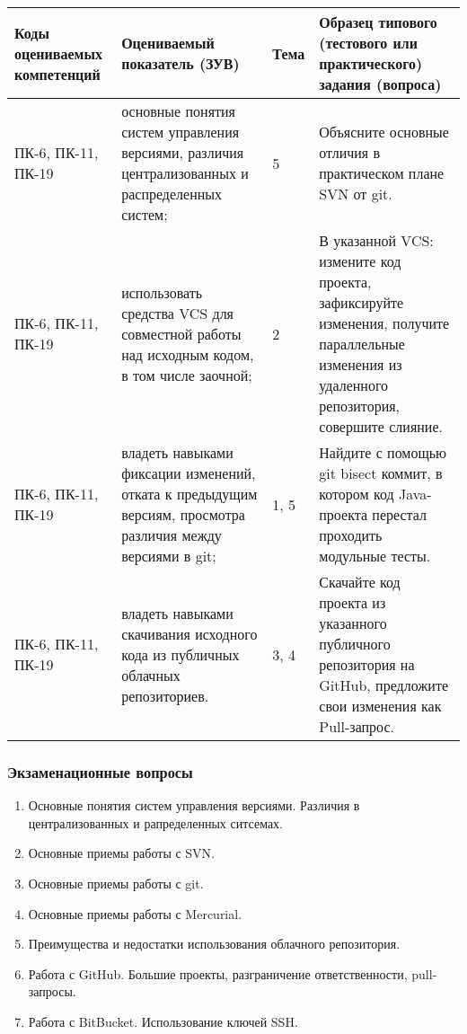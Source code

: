 \documentclass[a4paper,12pt]{article}
\begin{document}
\begin{longtable}{|p{15mm}|p{42mm}|p{17mm}|p{70mm}|}
\hline
\centering\small Коды оцениваемых компетенций  & \centering Оцениваемый показатель (ЗУВ) 
& \centering Тема  & \centering\arraybackslash Образец типового (тестового или практического) задания (вопроса)
\\
\hline

ПК-6, ПК-11, ПК-19 & 
основные понятия систем управления версиями, различия централизованных и распределенных систем; & 
5 & 
Объясните основные отличия в практическом плане SVN от git. 
\\
\hline
ПК-6, ПК-11, ПК-19 & 
использовать средства VCS для совместной работы над исходным кодом, в том числе заочной; & 
2 & 
В указанной VCS: измените код проекта, зафиксируйте изменения, получите параллельные изменения из удаленного репозитория, совершите слияние. 
\\
\hline
ПК-6, ПК-11, ПК-19 & 
владеть навыками фиксации изменений, отката к предыдущим версиям, просмотра различия между версиями в git; & 
1, 5 & 
Найдите с помощью git bisect коммит, в котором код Java-проекта перестал проходить модульные тесты. 
\\
\hline
ПК-6, ПК-11, ПК-19 & 
владеть навыками скачивания исходного кода из публичных облачных репозиториев. & 
3, 4 & 
Скачайте код проекта из указанного публичного репозитория на GitHub, предложите свои изменения как Pull-запрос. 
\\
\hline
\end{longtable}
\subsubsection*{Экзаменационные вопросы}
\begin{enumerate}
\item
Основные понятия систем управления версиями. Различия в централизованных и рапределенных ситсемах.
\item
Основные приемы работы с SVN.
\item
Основные приемы работы с git.
\item
Основные приемы работы с Mercurial.
\item
Преимущества и недостатки использования облачного репозитория.
\item
Работа с GitHub. Большие проекты, разграничение ответственности, pull-запросы.
\item
Работа с BitBucket. Использование ключей SSH.
\end{enumerate}
\end{document}
